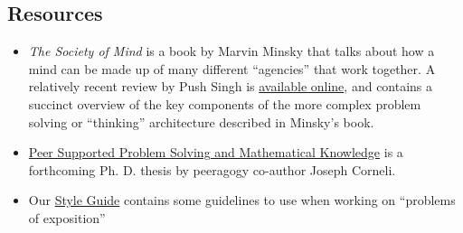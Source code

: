\subsection{Resources}

\begin{itemize}
\item
  \emph{The Society of Mind} is a book by Marvin Minsky that talks about
  how a mind can be made up of many different ``agencies'' that work
  together. A relatively recent review by Push Singh is
  \href{http://web.media.mit.edu/~push/ExaminingSOM.html}{available
  online}, and contains a succinct overview of the key components of the
  more complex problem solving or ``thinking'' architecture described in
  Minsky's book.
\item
  \href{http://metameso.org/~joe/thesis-outline.html}{Peer Supported
  Problem Solving and Mathematical Knowledge} is a forthcoming Ph. D.
  thesis by peeragogy co-author Joseph Corneli.
\item
  Our \href{http://peeragogy.org/style-guide/}{Style Guide} contains
  some guidelines to use when working on ``problems of exposition''
\end{itemize}
